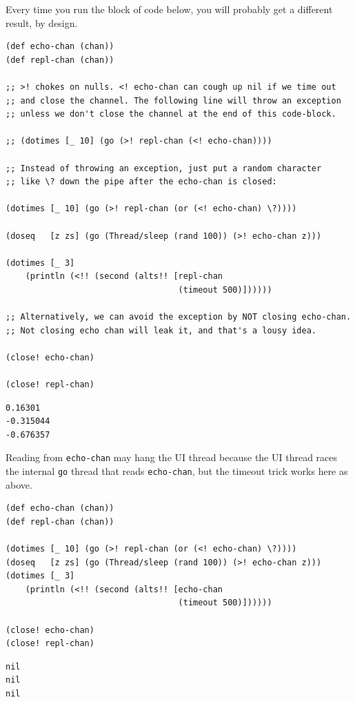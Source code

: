 \documentclass[10pt,oneside,x11names]{article}
\begin{document}
Every time you run the block of code below, you will probably get a different
result, by design.

\begin{verbatim}
(def echo-chan (chan))
(def repl-chan (chan))

;; >! chokes on nulls. <! echo-chan can cough up nil if we time out
;; and close the channel. The following line will throw an exception
;; unless we don't close the channel at the end of this code-block.

;; (dotimes [_ 10] (go (>! repl-chan (<! echo-chan))))

;; Instead of throwing an exception, just put a random character
;; like \? down the pipe after the echo-chan is closed:

(dotimes [_ 10] (go (>! repl-chan (or (<! echo-chan) \?))))

(doseq   [z zs] (go (Thread/sleep (rand 100)) (>! echo-chan z)))

(dotimes [_ 3]
    (println (<!! (second (alts!! [repl-chan
                                   (timeout 500)])))))

;; Alternatively, we can avoid the exception by NOT closing echo-chan.
;; Not closing echo chan will leak it, and that's a lousy idea.

(close! echo-chan)

(close! repl-chan)
\end{verbatim}

\begin{verbatim}
0.16301
-0.315044
-0.676357
\end{verbatim}


Reading from \texttt{echo-chan} may hang the UI thread because the UI thread
races the internal \texttt{go} thread that reads \texttt{echo-chan}, but the timeout trick
works here as above.

\begin{verbatim}
(def echo-chan (chan))
(def repl-chan (chan))

(dotimes [_ 10] (go (>! repl-chan (or (<! echo-chan) \?))))
(doseq   [z zs] (go (Thread/sleep (rand 100)) (>! echo-chan z)))
(dotimes [_ 3]
    (println (<!! (second (alts!! [echo-chan
                                   (timeout 500)])))))

(close! echo-chan)
(close! repl-chan)
\end{verbatim}

\begin{verbatim}
nil
nil
nil
\end{verbatim}
\end{document}
